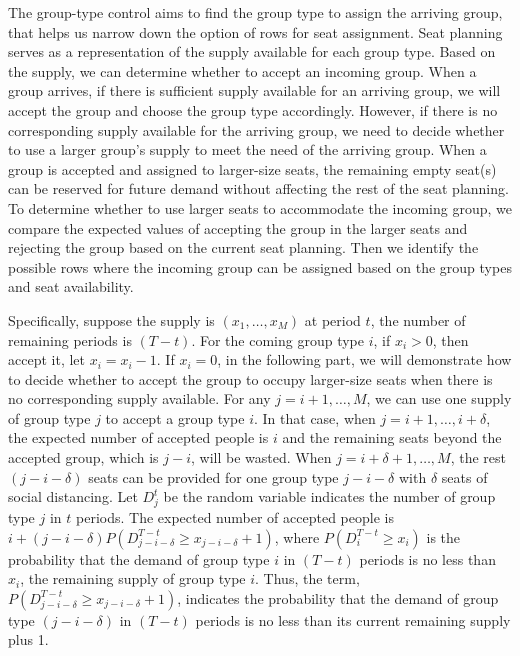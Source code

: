 The group-type control aims to find the group type to assign the arriving group, that helps us narrow down the option of rows for seat assignment. Seat planning serves as a representation of the supply available for each group type. Based on the supply, we can determine whether to accept an incoming group. When a group arrives, if there is sufficient supply available for an arriving group, we will accept the group and choose the group type accordingly. However, if there is no corresponding supply available for the arriving group, we need to decide whether to use a larger group's supply to meet the need of the arriving group. When a group is accepted and assigned to larger-size seats, the remaining empty seat(s) can be reserved for future demand without affecting the rest of the seat planning. To determine whether to use larger seats to accommodate the incoming group, we compare the expected values of accepting the group in the larger seats and rejecting the group based on the current seat planning. Then we identify the possible rows where the incoming group can be assigned based on the group types and seat availability.


Specifically, suppose the supply is $(x_1, \ldots, x_M)$ at period $t$, the number of remaining periods is $(T-t)$. For the coming group type $i$, if $x_i > 0$, then accept it, let $x_i = x_i -1$.
If $x_i = 0$, in the following part, we will demonstrate how to decide whether to accept the group to occupy larger-size seats when there is no corresponding supply available. For any $j=i+1, \ldots, M$, we can use one supply of group type $j$ to accept a group type $i$. In that case, when $j = i+1, \ldots, i+\delta$, the expected number of accepted people is $i$ and the remaining seats beyond the accepted group, which is $j-i$, will be wasted. When $j = i+\delta+1, \ldots, M$, the rest $(j-i-\delta)$ seats can be provided for one group type $j-i-\delta$ with $\delta$ seats of social distancing. Let $D_j^{t}$ be the random variable indicates the number of group type $j$ in $t$ periods. The expected number of accepted people is $i + (j-i-\delta)P(D_{j-i-\delta}^{T-t} \geq x_{j-i-\delta}+1)$, where $P(D_i^{T-t} \geq x_i)$ is the probability that the demand of group type $i$ in $(T-t)$ periods is no less than $x_i$, the remaining supply of group type $i$. Thus, the term, $P(D_{j-i-\delta}^{T-t} \geq x_{j-i-\delta}+1)$, indicates the probability that the demand of group type $(j-i-\delta)$ in $(T-t)$ periods is no less than its current remaining supply plus 1. 

